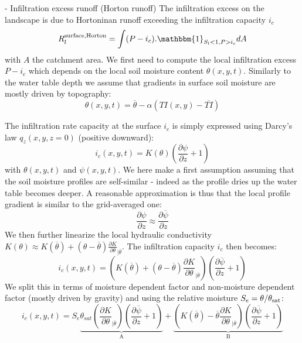 \documentclass[twoside,10pt]{report}
\begin{document}
- Infiltration excess runoff (Horton runoff)
The infiltration excess on the landscape is due to Hortoninan runoff exceeding the infiltration capacity $i_c$ 
 \begin{equation}
    R_l^{\rm surface, Horton} = \int (P-i_c).\mathbbm{1}_{S_l < 1, P>i_c} dA
\end{equation}
with $A$ the catchment area.
We first need to compute the local infiltration excess $P-i_c$ which depends on the local soil moisture content $\theta(x,y,t)$. Similarly to the water table depth we assume that gradients in surface soil moisture are mostly driven by topography:
\begin{equation}
    \theta(x,y,t) = \overline{\theta} -  \alpha (TI(x,y)-\overline{TI})
\end{equation}

The infiltration rate capacity at the surface $i_c$ is simply expressed using Darcy's law $q_z(x,y,z=0)$ (positive downward):
 \begin{equation}
    i_c(x,y,t) = K(\theta) \left( \frac{\partial \psi}{\partial z} + 1 \right)
\end{equation}
with $\theta(x,y,t)$ and $\psi(x,y,t)$.
We here make a first assumption assuming that the soil moisture profiles are self-similar - indeed as the profile dries up the water table becomes deeper. A reasonable approximation is thus that the local profile gradient is similar to the grid-averaged one:
 \begin{equation}
     \frac{\partial \psi}{\partial z} \approx \frac{\partial \overline \psi}{\partial z} 
\end{equation}
We then further linearize the local hydraulic conductivity $K(\theta) \approx K(\overline \theta) + (\theta-\overline{\theta})\frac{\partial K}{\partial \theta }_{|\overline\theta}$.
The infiltration capacity $i_c$ then becomes:
 \begin{equation}
    i_c(x,y,t) = \left( K(\overline \theta) + (\theta-\overline{\theta})\frac{\partial K}{\partial \theta }_{|\overline\theta} \right)\left( \frac{\partial \overline \psi}{\partial z} + 1 \right)
\end{equation}
We split this in terms of moisture dependent factor and non-moisture dependent factor (mostly driven by gravity) and using the relative moisture $S_e=\theta/\theta_{\rm sat}$:
 \begin{equation}
    i_c(x,y,t) = 
    S_e \underbrace{\theta_{sat}\left(\frac{\partial K}{\partial \theta }_{|\overline\theta} \right)\left( \frac{\partial \overline \psi}{\partial z} + 1 \right)}_{\text{A}}  + \underbrace{\left( K(\overline \theta) -\overline{\theta}\frac{\partial K}{\partial \theta }_{|\overline\theta} \right)\left( \frac{\partial \overline \psi}{\partial z} + 1 \right)}_{\text{B}} 
\end{equation}
\end{document}
